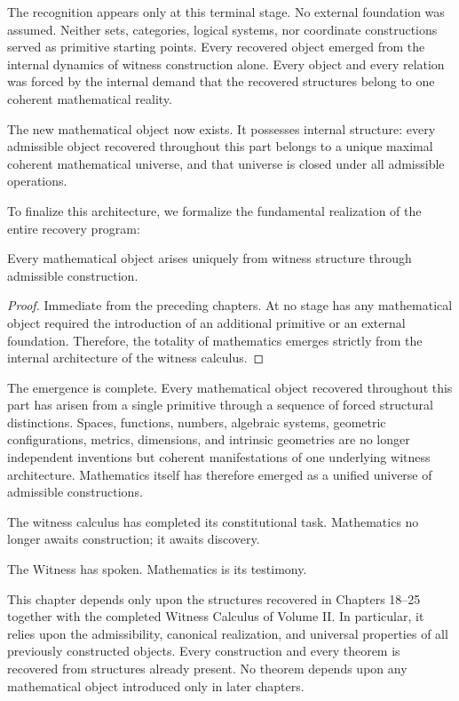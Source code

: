 \documentclass[12pt,anyside]{book}
\begin{document}
The recognition appears only at this terminal stage. No external foundation was assumed. Neither sets, categories, logical systems, nor coordinate constructions served as primitive starting points. Every recovered object emerged from the internal dynamics of witness construction alone. Every object and every relation was forced by the internal demand that the recovered structures belong to one coherent mathematical reality.

The new mathematical object now exists. It possesses internal structure: every admissible object recovered throughout this part belongs to a unique maximal coherent mathematical universe, and that universe is closed under all admissible operations.

To finalize this architecture, we formalize the fundamental realization of the entire recovery program:

\begin{theorem}
Every mathematical object arises uniquely from witness structure through admissible construction.
\end{theorem}

\begin{proof}
Immediate from the preceding chapters. At no stage has any mathematical object required the introduction of an additional primitive or an external foundation. Therefore, the totality of mathematics emerges strictly from the internal architecture of the witness calculus.
\end{proof}

The emergence is complete. Every mathematical object recovered throughout this part has arisen from a single primitive through a sequence of forced structural distinctions. Spaces, functions, numbers, algebraic systems, geometric configurations, metrics, dimensions, and intrinsic geometries are no longer independent inventions but coherent manifestations of one underlying witness architecture. Mathematics itself has therefore emerged as a unified universe of admissible constructions. 

The witness calculus has completed its constitutional task. Mathematics no longer awaits construction; it awaits discovery.

The Witness has spoken. Mathematics is its testimony.

\begin{dependencyaudit}
This chapter depends only upon the structures recovered in Chapters 18--25 together with the completed Witness Calculus of Volume II. In particular, it relies upon the admissibility, canonical realization, and universal properties of all previously constructed objects. Every construction and every theorem is recovered from structures already present. No theorem depends upon any mathematical object introduced only in later chapters.
\end{dependencyaudit}
\end{document}
